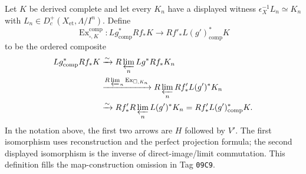 \begin{definition}
\label{def:weil-pbc-completed-base-change-map}
Let $K$ be derived complete and let every $K_n$ have a displayed witness
$\epsilon_X^{-1}L_n\simeq K_n$ with
$L_n\in D_c^+(X_{\mathrm{et}},\Lambda/I^n)$.  Define
\[
 \operatorname{Ex}^{\mathrm{comp}}_{\square,K}:
 Lg^*_{\mathrm{comp}}Rf_*K\longrightarrow
 Rf'_*L(g')^*_{\mathrm{comp}}K
\]
to be the ordered composite
\[
\begin{aligned}
 Lg^*_{\mathrm{comp}}Rf_*K
 &\xrightarrow{\sim}R\varprojlim_n Lg^*Rf_*K_n\\
 &\xrightarrow{R\varprojlim_n\operatorname{Ex}_{\square,K_n}}
 R\varprojlim_nRf'_*L(g')^*K_n\\
 &\xrightarrow{\sim}Rf'_*R\varprojlim_nL(g')^*K_n
 =Rf'_*L(g')^*_{\mathrm{comp}}K.
\end{aligned}
\]
In the notation above, the first two arrows are $H$ followed by $V'$.
The first isomorphism uses reconstruction and the perfect projection formula;
the second displayed isomorphism is the inverse of direct-image/limit
commutation.  This definition fills the map-construction omission in Tag
\texttt{09C9}.
\end{definition}


